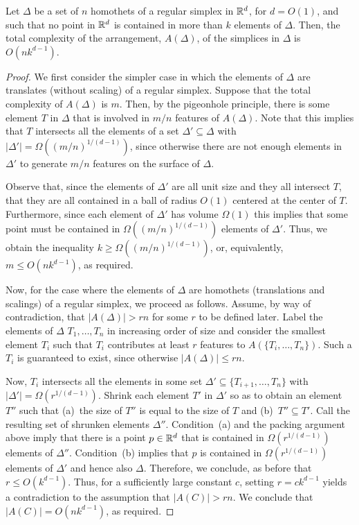 \documentclass{llncs}
\begin{document}
\begin{lem}
  Let $\Delta$ be a set of $n$ homothets of a regular simplex in $\mathbb{R}^d$,
  for $d=O(1)$, and such that no point in $\mathbb{R}^d$ is contained in more
  than $k$ elements of $\Delta$.  Then, the total complexity of the
  arrangement, $A(\Delta)$, of the simplices in $\Delta$ is $O(nk^{d-1})$.
\end{lem}

\begin{proof}
  We first consider the simpler case in which the elements of $\Delta$
  are translates (without scaling) of a regular simplex.  Suppose that
  the total complexity of $A(\Delta)$ is $m$.  Then, by the pigeonhole
  principle, there is some element $T$ in $\Delta$ that is involved
  in $m/n$ features of $A(\Delta)$.  Note that this implies that $T$
  intersects all the elements of a set $\Delta'\subseteq\Delta$ with
  $|\Delta'|=\Omega((m/n)^{1/(d-1)})$, since otherwise there are not
  enough elements in $\Delta'$ to generate $m/n$ features on the surface
  of $\Delta$.

  Observe that, since the elements of $\Delta'$ are all unit size and
  they all intersect $T$, that they are all contained in a ball of
  radius $O(1)$ centered at the center of $T$.  Furthermore, since each
  element of $\Delta'$ has volume $\Omega(1)$ this implies that some point
  must be contained in $\Omega((m/n)^{1/(d-1)})$ elements of $\Delta'$.
  Thus, we obtain the inequality $k \ge \Omega((m/n)^{1/(d-1)})$, or,
  equivalently, $m \le O(nk^{d-1})$, as required.

  Now, for the case where the elements of $\Delta$ are homothets
  (translations and scalings) of a regular simplex, we proceed as follows.
  Assume, by way of contradiction, that $|A(\Delta)| > rn$ for some $r$
  to be defined later.  Label the elements of $\Delta$ $T_1,\ldots,T_n$
  in increasing order of size and consider the smallest element $T_i$ such
  that $T_i$ contributes at least $r$ features to $A(\{T_i,\ldots,T_n\})$.
  Such a $T_i$ is guaranteed to exist, since otherwise $|A(\Delta)|\le
  rn$.

  Now, $T_i$ intersects all the elements in some set $\Delta'\subseteq
  \{T_{i+1},\ldots,T_n\}$ with $|\Delta'| = \Omega(r^{1/(d-1)})$.
  Shrink each element $T'$ in $\Delta'$ so as to obtain an element
  $T''$ such that (a)~the size of $T''$ is equal to the size of $T$ and
  (b)~$T'' \subseteq T'$.  Call the resulting set of shrunken elements
  $\Delta''$.  Condition~(a) and the packing argument above imply that
  there is a point $p\in\mathbb{R}^d$ that is contained in $\Omega(r^{1/(d-1)})$
  elements of $\Delta''$.  Condition~(b) implies that $p$ is contained in
  $\Omega(r^{1/(d-1)})$ elements of $\Delta'$ and hence also $\Delta$.
  Therefore, we conclude, as before that $r \le O(k^{d-1})$.  Thus,
  for a sufficiently large constant $c$, setting $r=ck^{d-1}$ yields a
  contradiction to the assumption that $|A(C)| > rn$.  We conclude that
  $|A(C)| = O(nk^{d-1})$, as required.
\end{proof}
\end{document}
